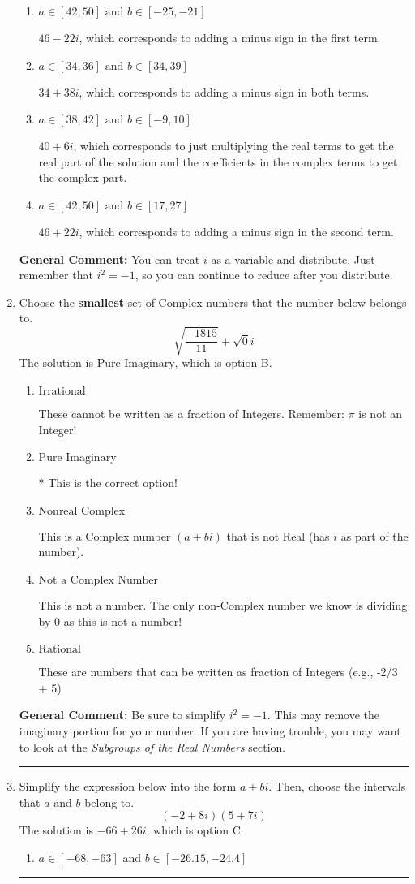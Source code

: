 \documentclass{extbook}[14pt]
\newcommand{\litem}[1]{\item #1

\rule{\textwidth}{0.4pt}}
\begin{document}
\begin{enumerate}
{\begin{enumerate}[label=\Alph*.]
* $34 - 38 i$, which is the correct option.
\item \( a \in [42, 50] \text{ and } b \in [-25, -21] \)

 $46 - 22 i$, which corresponds to adding a minus sign in the first term.
\item \( a \in [34, 36] \text{ and } b \in [34, 39] \)

 $34 + 38 i$, which corresponds to adding a minus sign in both terms.
\item \( a \in [38, 42] \text{ and } b \in [-9, 10] \)

 $40 + 6 i$, which corresponds to just multiplying the real terms to get the real part of the solution and the coefficients in the complex terms to get the complex part.
\item \( a \in [42, 50] \text{ and } b \in [17, 27] \)

 $46 + 22 i$, which corresponds to adding a minus sign in the second term.
\end{enumerate}

\textbf{General Comment:} You can treat $i$ as a variable and distribute. Just remember that $i^2=-1$, so you can continue to reduce after you distribute.
}
\litem{
Choose the \textbf{smallest} set of Complex numbers that the number below belongs to.
\[ \sqrt{\frac{-1815}{11}}+\sqrt{0}i \]The solution is \( \text{Pure Imaginary} \), which is option B.\begin{enumerate}[label=\Alph*.]
\item \( \text{Irrational} \)

These cannot be written as a fraction of Integers. Remember: $\pi$ is not an Integer!
\item \( \text{Pure Imaginary} \)

* This is the correct option!
\item \( \text{Nonreal Complex} \)

This is a Complex number $(a+bi)$ that is not Real (has $i$ as part of the number).
\item \( \text{Not a Complex Number} \)

This is not a number. The only non-Complex number we know is dividing by 0 as this is not a number!
\item \( \text{Rational} \)

These are numbers that can be written as fraction of Integers (e.g., -2/3 + 5)
\end{enumerate}

\textbf{General Comment:} Be sure to simplify $i^2 = -1$. This may remove the imaginary portion for your number. If you are having trouble, you may want to look at the \textit{Subgroups of the Real Numbers} section.
}
\litem{
Simplify the expression below into the form $a+bi$. Then, choose the intervals that $a$ and $b$ belong to.
\[ (-2 + 8 i)(5 + 7 i) \]The solution is \( -66 + 26 i \), which is option C.\begin{enumerate}[label=\Alph*.]
\item \( a \in [-68, -63] \text{ and } b \in [-26.15, -24.4] \)


\end{enumerate}}
\end{enumerate}
\end{document}

